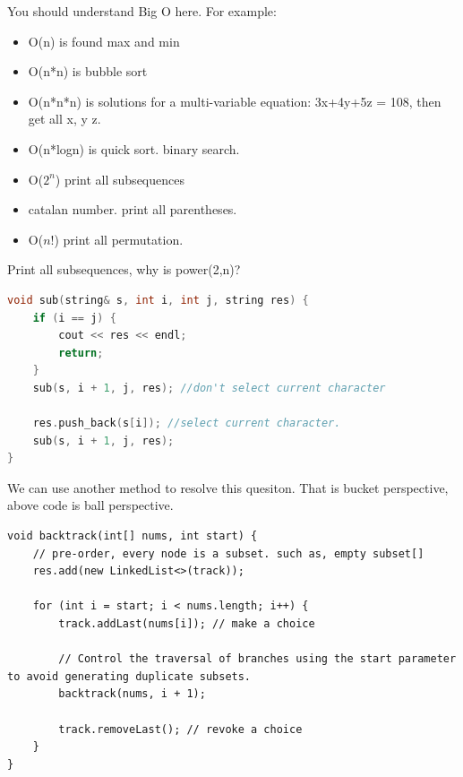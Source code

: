 \documentclass[a4paper,11pt,twoside]{book}
\begin{document}
	\par You should understand Big O here. For example:
	\begin{itemize}
		\item O(n) is found max and min
		
		\item O(n*n) is bubble sort
		
		\item O(n*n*n) is solutions for a multi-variable equation: 3x+4y+5z = 108, then get all x, y z.
		
		\item O(n*logn) is quick sort. binary search. 
		
		\item O($2^{n}$) print all subsequences
		
		\item catalan number. print all parentheses.
		
		\item O($n!$) print all permutation.
	\end{itemize}
		
	\par Print all subsequences, why is power(2,n)?

\begin{lstlisting}[frame=single, language=c++]
void sub(string& s, int i, int j, string res) {
	if (i == j) {
		cout << res << endl;
		return;
	}
	sub(s, i + 1, j, res); //don't select current character
	
	res.push_back(s[i]); //select current character.
	sub(s, i + 1, j, res);
}	
\end{lstlisting}	
	
	\par We can use another method to resolve this quesiton. That is bucket perspective, above code is ball perspective. 
	
\begin{lstlisting}
void backtrack(int[] nums, int start) {	
	// pre-order, every node is a subset. such as, empty subset[]
	res.add(new LinkedList<>(track));

	for (int i = start; i < nums.length; i++) {
		track.addLast(nums[i]); // make a choice
		
		// Control the traversal of branches using the start parameter to avoid generating duplicate subsets.
		backtrack(nums, i + 1);
		
		track.removeLast(); // revoke a choice
	}
}
\end{lstlisting}
	
\end{document}
